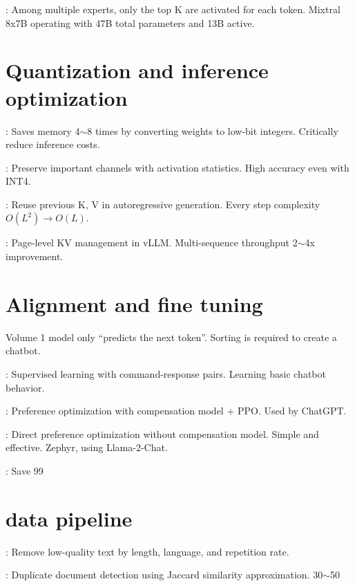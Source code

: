 : Among multiple experts, only the top K are activated for each token. Mixtral 8x7B operating with 47B total parameters and 13B active.

\section{Quantization and inference optimization}

: Saves memory 4$\sim$8 times by converting weights to low-bit integers. Critically reduce inference costs.

: Preserve important channels with activation statistics. High accuracy even with INT4.

: Reuse previous K, V in autoregressive generation. Every step complexity$O(L^2) \to O(L)$.

: Page-level KV management in vLLM. Multi-sequence throughput 2$\sim$4x improvement.

\section{Alignment and fine tuning}

Volume 1 model only ``predicts the next token''. Sorting is required to create a chatbot.

: Supervised learning with command-response pairs. Learning basic chatbot behavior.

: Preference optimization with compensation model + PPO. Used by ChatGPT.

: Direct preference optimization without compensation model. Simple and effective. Zephyr, using Llama-2-Chat.

: Save 99%

\section{data pipeline}

: Remove low-quality text by length, language, and repetition rate.

: Duplicate document detection using Jaccard similarity approximation. 30$\sim$50%

